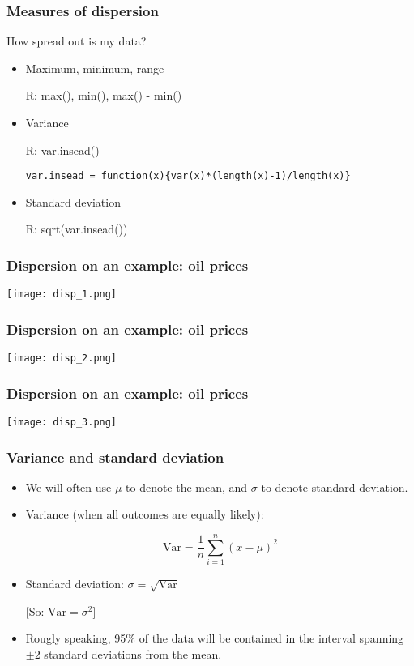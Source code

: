 \documentclass[xcolor=dvipsnames]{beamer} %
\begin{document}
\begin{frame}[fragile]
\frametitle{Measures of dispersion}
\begin{scriptsize}
How spread out is my data?
\begin{itemize}
\item Maximum, minimum, range
\item[] \textcolor{dark_red}{ \textsf{R}: max(), min(), max() - min() }
\item Variance 
\item[] \textcolor{dark_red}{ \textsf{R}: var.insead() }
\begin{verbatim}
var.insead = function(x){var(x)*(length(x)-1)/length(x)}
\end{verbatim}
\item Standard deviation 
\item[] \textcolor{dark_red}{\textsf{R}: sqrt(var.insead()) }
\end{itemize}
\end{scriptsize}
\end{frame}



\begin{frame}
\frametitle{Dispersion on an example: oil prices}
\begin{center}
\hspace*{-0.55cm} \texttt{[image: disp\_1.png]}
\end{center}
\end{frame}

\begin{frame}
\frametitle{Dispersion on an example: oil prices}
\begin{center}
\hspace*{-0.55cm} \texttt{[image: disp\_2.png]}
\end{center}
\end{frame}

\begin{frame}
\frametitle{Dispersion on an example: oil prices}
\begin{center}
\hspace*{-0.55cm} \texttt{[image: disp\_3.png]}
\end{center}
\end{frame}

\begin{frame}
\frametitle{Variance and standard deviation}
\begin{itemize}
	\itemsep\setlength{1em}
\item We will often use $\mu$ to denote the mean, and $\sigma$ to denote standard deviation. 
\item Variance (when all outcomes are equally likely):
\item[] $$ \textrm{Var} = \frac{1}{n} \sum_{i=1}^n (x - \mu)^2 $$
\item Standard deviation: $\sigma = \sqrt{\textrm{Var}} $
\item[] [So: $\textrm{Var} = \sigma^2$]
\item Rougly speaking, 95\% of the data will be contained in the interval spanning $\pm 2$ standard deviations from the mean. 
\end{itemize}
\end{frame}
\end{document}
